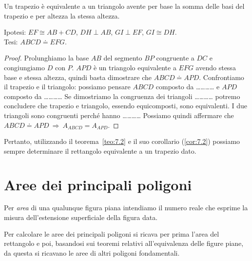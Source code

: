 \begin{teorema}\label{teo:7.3}
Un trapezio è equivalente a un triangolo avente per base la somma 
delle basi del trapezio e per altezza la stessa altezza.
\end{teorema}

\noindent Ipotesi: $EF\cong AB+CD$, $DH\perp AB$, $GI\perp EF$, 
$GI\cong DH$.\\
Tesi: $ABCD\doteq EFG$.

\begin{figure*}[!htb]
  \centering
\end{figure*}

\noindent\begin{minipage}{0.65\textwidth}\parindent15pt
\begin{proof}
Prolunghiamo la base $AB$ del segmento $BP$ congruente a $DC$ e 
congiungiamo $D$ con $P$.
$APD$ è un triangolo equivalente a $EFG$ avendo stessa base e stessa 
altezza, quindi basta dimostrare che $ABCD\doteq APD$.
Confrontiamo il trapezio e il triangolo: possiamo pensare 
$ABCD$ composto da \ldots\ldots\ldots\ldots{} 
e $APD$ composto da \ldots\ldots\ldots\ldots{}
Se dimostriamo la congruenza dei triangoli \ldots\ldots\ldots\ldots{}
potremo concludere che trapezio e triangolo, essendo equicomposti, 
sono equivalenti. 
I due triangoli sono congruenti perché hanno 
\ldots\ldots\ldots\ldots{} 
Possiamo quindi affermare che $ABCD\doteq APD \:\Rightarrow\: 
A_{ABCD}=A_{APD}$.
\end{proof}
\end{minipage}\hfil
\begin{minipage}{0.35\textwidth}
  \centering
\end{minipage}\vspace{8pt}

Pertanto, utilizzando il teorema~\ref{teo:7.2} e il suo corollario 
(\ref{cor:7.2}) possiamo sempre determinare il rettangolo equivalente 
a un trapezio dato.


\section{Aree dei principali poligoni}
\label{sect:aree_poligoni}

Per \emph{area} di una qualunque figura piana intendiamo il numero 
reale che esprime la misura dell'estensione superficiale della figura 
data.

Per calcolare le aree dei principali poligoni si ricava per prima 
l'area del rettangolo e poi, basandosi sui teoremi relativi 
all'equivalenza delle figure piane, da questa si ricavano le aree di 
altri poligoni fondamentali.

